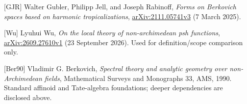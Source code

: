\documentclass[
  11pt,
]{article}
\begin{document}
{[}GJR{]} Walter Gubler, Philipp Jell, and Joseph Rabinoff, \emph{Forms
on Berkovich spaces based on harmonic tropicalizations},
\href{https://arxiv.org/abs/2111.05741v3}{arXiv:2111.05741v3} (7 March
2025).

{[}Wu{]} Lyuhui Wu, \emph{On the local theory of non-archimedean psh
functions},
\href{https://arxiv.org/abs/2609.27610v1}{arXiv:2609.27610v1} (23
September 2026). Used for definition/scope comparison only.

{[}Ber90{]} Vladimir G. Berkovich, \emph{Spectral theory and analytic
geometry over non-Archimedean fields}, Mathematical Surveys and
Monographs 33, AMS, 1990. Standard affinoid and Tate-algebra
foundations; deeper dependencies are disclosed above.
\end{document}
